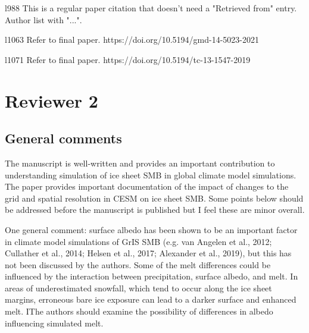 \documentclass[12pt,oneside,a4paper]{article}%
\begin{document}
{\color{blue}{Done.}} \newline

l988 This is a regular paper citation that doesn't need a "Retrieved from" entry. Author list with "...". \newline

l1063 Refer to final paper. https://doi.org/10.5194/gmd-14-5023-2021 \newline

{\color{blue}{Done.}} \newline

l1071 Refer to final paper. https://doi.org/10.5194/tc-13-1547-2019 \newline

{\color{blue}{Done.}}

\section*{Reviewer 2}

\subsection*{General comments}

The manuscript is well-written and provides an important contribution to understanding simulation of ice sheet SMB in global climate model simulations. The paper provides important documentation of the impact of changes to the grid and spatial resolution in CESM on ice sheet SMB. Some points below should be addressed before the manuscript is published but I feel these are minor overall. \newline

One general comment: surface albedo has been shown to be an important factor in climate model simulations of GrIS SMB (e.g. van Angelen et al., 2012; Cullather et al., 2014; Helsen et al., 2017; Alexander et al., 2019), but this has not been discussed by the authors. Some of the melt differences could be influenced by the interaction between precipitation, surface albedo, and melt. In areas of underestimated snowfall, which tend to occur along the ice sheet margins, erroneous bare ice exposure can lead to a darker surface and enhanced melt. IThe authors should examine the possibility of differences in albedo influencing simulated melt. \newline

\end{document}
